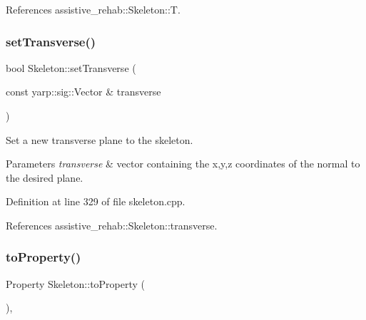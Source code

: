 References assistive\+\_\+rehab\+::\+Skeleton\+::T.

\mbox{\label{classassistive__rehab_1_1Skeleton_a1aeba05a17363afc08c30397d17375df}} 
\subsubsection{\texorpdfstring{setTransverse()}{setTransverse()}}
{\footnotesize\ttfamily bool Skeleton\+::set\+Transverse (\begin{DoxyParamCaption}\item[{const yarp\+::sig\+::\+Vector \&}]{transverse }\end{DoxyParamCaption})\hspace{0.3cm}{\ttfamily [inherited]}}



Set a new transverse plane to the skeleton. 


\begin{DoxyParams}{Parameters}
{\em transverse} & vector containing the x,y,z coordinates of the normal to the desired plane. \\
\hline
\end{DoxyParams}


Definition at line 329 of file skeleton.\+cpp.


\begin{DoxyCode}{0}

\end{DoxyCode}


References assistive\+\_\+rehab\+::\+Skeleton\+::transverse.

\mbox{\label{classassistive__rehab_1_1Skeleton_ad58ea53a165abc3f39a3c46594f0560f}} 
\subsubsection{\texorpdfstring{toProperty()}{toProperty()}}
{\footnotesize\ttfamily Property Skeleton\+::to\+Property (\begin{DoxyParamCaption}{ }\end{DoxyParamCaption})\hspace{0.3cm}{\ttfamily [virtual]}, {\ttfamily [inherited]}}



